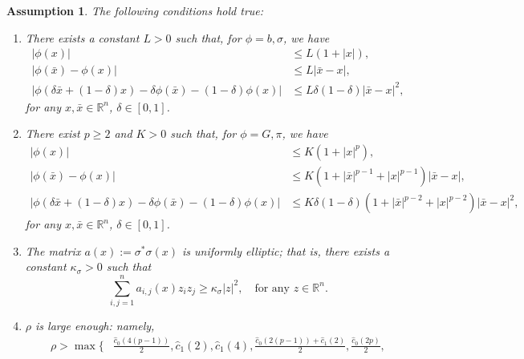 \documentclass[10pt,a4paper]{amsart}
\newtheorem{assumption}{Assumption}
\begin{document}
\begin{assumption}
    \label{assumption general}
    The following conditions hold true: 
    \begin{enumerate}
    \item\label{condition b sigma} There exists a constant $L>0$ such that, for $\phi = b, \sigma$, we have
    $$ \begin{aligned}
         | \phi (x)| & \leq L (1+|x|),\\ 
        |\phi (\bar x) - \phi (x)|  & \leq L |\bar x - x|, \\
        | \phi ( \delta \bar x + (1-\delta)x) - \delta \phi(\bar x) - (1-\delta) \phi ( x) |  &\leq  L \delta (1-\delta)  |\bar{x}-x|^2,
    \end{aligned}
    $$
    for any $x, \bar x \in \mathbb R ^n$, $\delta \in [0,1]$. 
    \item\label{condition costs} There exist $p\geq 2$ and $K>0$ such that, for $\phi = G, \pi$, we have
    $$
    \begin{aligned}
    |\phi(x)| &\leq K (1+|x|^p), \\
    |\phi (\bar x) - \phi (x) | &\leq K (1+|\bar x|^{p-1} + |x|^{p-1})|\bar x -x |, \\
    |\phi ( \delta \bar x + (1-\delta)x) - \delta \phi(\bar x) - (1-\delta) \phi ( x) | &\leq  K \delta (1-\delta) (1+|\bar x|^{p-2} + |x|^{p-2}) |\bar{x}-x|^2, 
    \end{aligned}
    $$
    for any $x, \bar x \in \mathbb R ^n$, $\delta \in [0,1]$. 
    \item\label{codition ellipticity} The matrix $a(x):=\sigma^* \sigma (x) $ is uniformly elliptic; that is, there exists a constant $\kappa_\sigma >0$ such that 
    $$
    \sum_{i,j=1}^n a_{i,j} (x) z_i z_j \geq \kappa_\sigma |z|^2, \quad \text{for any $z \in \mathbb R ^n$.}
    $$
    \item\label{condition rho} $\rho$ is large enough: namely,
     $$
     \begin{aligned}
    \rho > \max \Big\{ & 
    \frac{\hat c _0 ( 4(p-1))}{2}, 
    \hat c _1(2), 
    {\hat c _1(4)} , 
    \frac{\hat c _0 ( 2(p-1))+ \hat c _1(2)}{2}, 
    \frac{\hat c _0(2p)}{2},

\end{aligned}$$
\end{enumerate}
\end{assumption}
\end{document}
